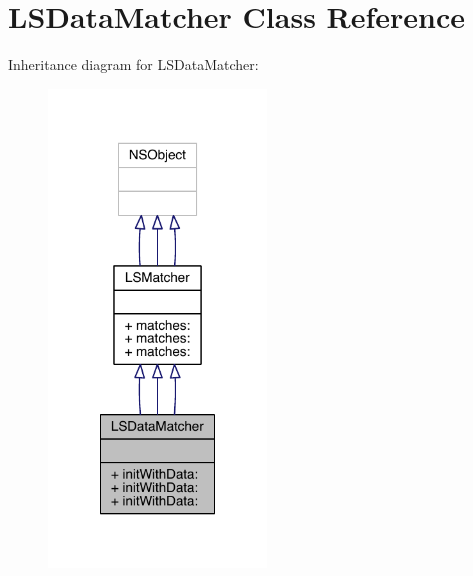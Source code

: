\hypertarget{interface_l_s_data_matcher}{\section{L\-S\-Data\-Matcher Class Reference}
\label{interface_l_s_data_matcher}
}


Inheritance diagram for L\-S\-Data\-Matcher\-:\nopagebreak
\begin{figure}[H]
\begin{center}
\leavevmode
\includegraphics[width=164pt]{interface_l_s_data_matcher__inherit__graph}
\end{center}
\end{figure}


